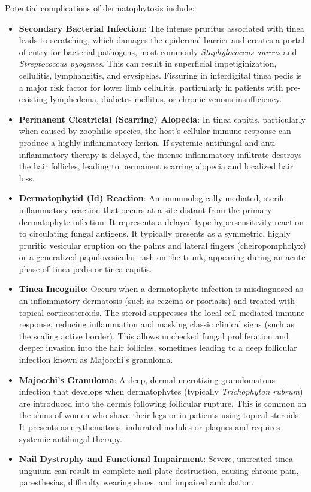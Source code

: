 Potential complications of dermatophytosis include:
\begin{itemize}
    \item \textbf{Secondary Bacterial Infection}: The intense pruritus associated with tinea leads to scratching, which damages the epidermal barrier and creates a portal of entry for bacterial pathogens, most commonly \textit{Staphylococcus aureus} and \textit{Streptococcus pyogenes}. This can result in superficial impetiginization, cellulitis, lymphangitis, and erysipelas. Fissuring in interdigital tinea pedis is a major risk factor for lower limb cellulitis, particularly in patients with pre-existing lymphedema, diabetes mellitus, or chronic venous insufficiency.
    \item \textbf{Permanent Cicatricial (Scarring) Alopecia}: In tinea capitis, particularly when caused by zoophilic species, the host's cellular immune response can produce a highly inflammatory kerion. If systemic antifungal and anti-inflammatory therapy is delayed, the intense inflammatory infiltrate destroys the hair follicles, leading to permanent scarring alopecia and localized hair loss.
    \item \textbf{Dermatophytid (Id) Reaction}: An immunologically mediated, sterile inflammatory reaction that occurs at a site distant from the primary dermatophyte infection. It represents a delayed-type hypersensitivity reaction to circulating fungal antigens. It typically presents as a symmetric, highly pruritic vesicular eruption on the palms and lateral fingers (cheiropompholyx) or a generalized papulovesicular rash on the trunk, appearing during an acute phase of tinea pedis or tinea capitis.
    \item \textbf{Tinea Incognito}: Occurs when a dermatophyte infection is misdiagnosed as an inflammatory dermatosis (such as eczema or psoriasis) and treated with topical corticosteroids. The steroid suppresses the local cell-mediated immune response, reducing inflammation and masking classic clinical signs (such as the scaling active border). This allows unchecked fungal proliferation and deeper invasion into the hair follicles, sometimes leading to a deep follicular infection known as Majocchi's granuloma.
    \item \textbf{Majocchi's Granuloma}: A deep, dermal necrotizing granulomatous infection that develops when dermatophytes (typically \textit{Trichophyton rubrum}) are introduced into the dermis following follicular rupture. This is common on the shins of women who shave their legs or in patients using topical steroids. It presents as erythematous, indurated nodules or plaques and requires systemic antifungal therapy.
    \item \textbf{Nail Dystrophy and Functional Impairment}: Severe, untreated tinea unguium can result in complete nail plate destruction, causing chronic pain, paresthesias, difficulty wearing shoes, and impaired ambulation.
\end{itemize}


